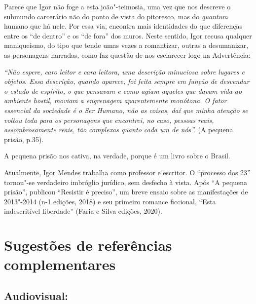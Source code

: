 \documentclass[11pt]{extarticle}
\begin{document}
Parece que Igor não foge a esta joão"-teimosia, uma vez que nos descreve
o submundo carcerário não do ponto de vista do pitoresco, mas do
\emph{quantum} humano que há nele. Por essa via, encontra mais
identidades do que diferenças entre os ``de dentro'' e os ``de fora''
dos muros. Neste sentido, Igor recusa qualquer maniqueísmo, do tipo que
tende umas vezes a romantizar, outras a desumanizar, as personagens
narradas, como faz questão de nos esclarecer logo na Advertência:

\emph{``Não espere, caro leitor e cara leitora, uma descrição minuciosa
sobre lugares e objetos. Essa descrição, quando aparece, foi feita
sempre em função de desvendar o estado de espírito, o que pensavam e
como agiam aqueles que davam vida ao ambiente hostil, moviam a
engrenagem aparentemente monótona. O fator essencial da sociedade é o
Ser Humano, não as coisas, daí que minha atenção se voltou toda para os
personagens que encontrei, no caso, pessoas reais, assombrosamente
reais, tão complexas quanto cada um de nós''.} (A pequena prisão, p.35).


A pequena prisão nos cativa, na verdade, porque é um livro sobre o
Brasil.

Atualmente, Igor Mendes trabalha como professor e escritor. O ``processo
dos 23'' tornou"-se verdadeiro imbróglio jurídico, sem desfecho à vista.
Após ``A pequena prisão'', publicou ``Resistir é preciso'', um breve
ensaio sobre as manifestações de 2013"-2014 (n-1 edições, 2018) e seu
primeiro romance ficcional, ``Esta indescritível liberdade'' (Faria e
Silva edições, 2020).

\section{Sugestões de referências complementares}

\subsection{Audiovisual:}
\end{document}
